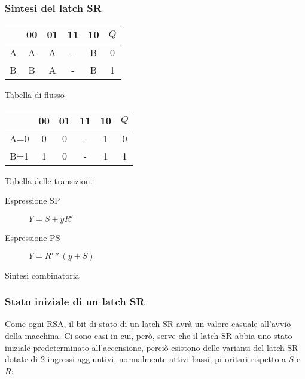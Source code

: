 \documentclass{article}
\begin{document}
\subsubsection{Sintesi del latch SR}

\begin{center}
\begin{multicols}{2}
\begin{tabular}{ |c|c|c|c|c|c| }
\hline
& 00 & 01 & 11 & 10 & $Q$ \\
\hline
\hline
A & A & A & - & B & 0 \\
B & B & A & - & B & 1 \\
\hline
\end{tabular}

Tabella di flusso
\end{multicols}

\begin{multicols}{2}
\begin{tabular}{ |c|c|c|c|c|c| }
\hline
& 00 & 01 & 11 & 10 & $Q$ \\
\hline
\hline
A=0 & 0 & 0 & - & 1 & 0 \\
B=1 & 1 & 0 & - & 1 & 1 \\
\hline
\end{tabular}

Tabella delle transizioni
\end{multicols}

\begin{multicols}{2}
\begin{description}
\item[Espressione SP] $Y = S + yR'$
\item[Espressione PS] $Y = R' * (y+S)$
\end{description}

Sintesi combinatoria
\end{multicols}
\end{center}

\subsubsection{Stato iniziale di un latch SR}

Come ogni RSA, il bit di stato di un latch SR avrà un valore casuale all'avvio della macchina.
Ci sono casi in cui, però, serve che il latch SR abbia uno stato iniziale predeterminato all'accensione, perciò esistono delle varianti del latch SR dotate di 2 ingressi aggiuntivi, normalmente attivi bassi, prioritari rispetto a $S$ e $R$:
\end{document}

